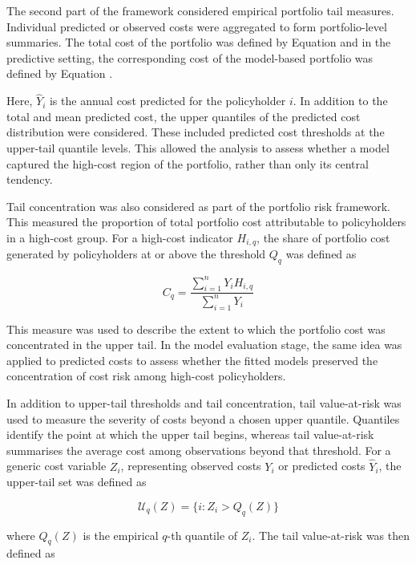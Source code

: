 	The second part of the framework considered empirical portfolio tail measures. Individual predicted or observed costs were aggregated to form portfolio-level summaries. The total cost of the portfolio was defined by Equation  and in the predictive setting, the corresponding cost of the model-based portfolio was defined by Equation .
	
	Here, \(\hat{Y}_i\) is the annual cost predicted for the policyholder \(i\). In addition to the total and mean predicted cost, the upper quantiles of the predicted cost distribution were considered. These included predicted cost thresholds at the upper-tail quantile levels. This allowed the analysis to assess whether a model captured the high-cost region of the portfolio, rather than only its central tendency.
	
	Tail concentration was also considered as part of the portfolio risk framework. This measured the proportion of total portfolio cost attributable to policyholders in a high-cost group. For a high-cost indicator \(H_{i,q}\), the share of portfolio cost generated by policyholders at or above the threshold \(Q_q\) was defined as
	
	\begin{equation}
		C_q =
		\frac{\sum_{i=1}^{n} Y_i H_{i,q}}
		{\sum_{i=1}^{n} Y_i}
	\end{equation}
	
	This measure was used to describe the extent to which the portfolio cost was concentrated in the upper tail. In the model evaluation stage, the same idea was applied to predicted costs to assess whether the fitted models preserved the concentration of cost risk among high-cost policyholders.
	
	In addition to upper-tail thresholds and tail concentration, tail value-at-risk was used to measure the severity of costs beyond a chosen upper quantile. Quantiles identify the point at which the upper tail begins, whereas tail value-at-risk summarises the average cost among observations beyond that threshold. For a generic cost variable \(Z_i\), representing observed costs \(Y_i\) or predicted costs \(\hat{Y}_i\), the upper-tail set was defined as
	
	\begin{equation}
		\mathcal{U}_q(Z)
		=
		\{ i : Z_i > Q_q(Z) \}
	\end{equation}
	
	where \(Q_q(Z)\) is the empirical \(q\)-th quantile of \(Z_i\). The tail value-at-risk was then defined as
	
